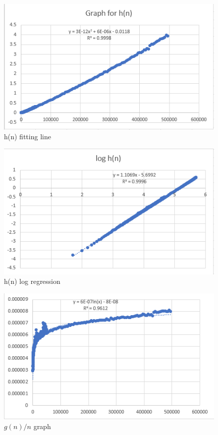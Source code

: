 \documentclass[titlepage, 12pt]{article}
\begin{document}
\begin{figure}[h]
    \includegraphics[width=\linewidth]{hn-1.png}
    \caption{h(n) fitting line}
\end{figure}\begin{figure}[h]
    \includegraphics[width=\linewidth]{hn-2.png}
    \caption{h(n) log regression}
\end{figure}\begin{figure}[h]
    \includegraphics[width=\linewidth]{hn-3.png}
    \caption{$g(n)/n$ graph }
\end{figure}
\end{document}
